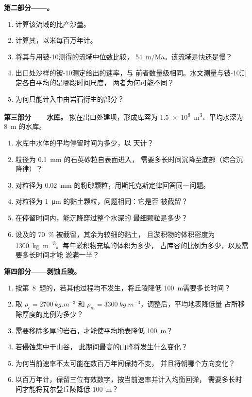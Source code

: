 \begin{problem}
\medskip
\noindent\textbf{第二部分——。}
\begin{enumerate}[resume]
  \item 计算该流域的比产沙量。
  \item 计算其，以米每百万年计。
  \item 将其与用铍-10测得的流域中位数比较，
        \qty{54}{m/Ma}。该流域是快还是慢？
  \item 出口处沙样的铍-10测定给出的速率，与
        前者数量级相同。水文测量与铍-10测定各自平均的是哪段时间尺度，
        两者为何可能不同？
  \item 为何只能计入中由岩石衍生的部分？
\end{enumerate}

\medskip
\noindent\textbf{第三部分——水库。}
拟在出口处建坝，形成库容为
\qty{1.5e6}{m^3}、平均水深为 \qty{8}{m} 的水库。
\begin{enumerate}[resume]
  \item 水库中水体的平均停留时间为多少，以
        天计？
  \item 粒径为 \qty{0.1}{mm} 的石英砂粒自表面进入，
        需要多长时间沉降至底部（综合沉降律）？
  \item 对粒径为 \qty{0.02}{mm} 的粉砂颗粒，用斯托克斯定律回答同一问题。
  \item 对粒径为 \qty{1}{\micro m} 的黏土颗粒，问题相同：它是否
        被截留？
  \item 在停留时间内，能沉降穿过整个水深的
        最细颗粒是多少？
  \item 设及的 \qty{70}{\percent} 被截留，其余为较细的黏土，
        且淤积物的体积密度为
        \qty{1300}{kg.m^{-3}}。每年淤积物充填的体积为多少，
        占库容的比例为多少，以及需要多长时间才能
        淤满一半？
\end{enumerate}

\medskip
\noindent\textbf{第四部分——剥蚀丘陵。}
\begin{enumerate}[resume]
  \item 按第~8~题的，若其他过程均不发生，将丘陵降低
        \qty{100}{m}需要多长时间？
  \item 取 $\rho_c = \qty{2700}{kg.m^{-3}}$ 和 $\rho_m =
        \qty{3300}{kg.m^{-3}}$，调整后，平均地表降低量
        占所移除厚度的比例为多少？
  \item 需要移除多厚的岩石，才能使平均地表降低
        \qty{100}{m}？
  \item 若侵蚀集中于山谷，
        此期间最高的山峰将发生什么变化？
  \item 为何当前速率不太可能在数百万年间保持不变，
        并且将朝哪个方向变化？
  \item 以百万年计，保留三位有效数字，按当前速率并计入均衡回弹，
        需要多长时间才能将瓦尔登丘陵降低
        \qty{100}{m}？
\end{enumerate}
\end{problem}
